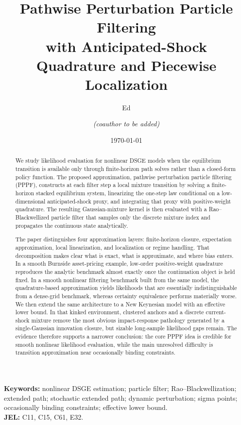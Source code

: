 \documentclass[11pt]{article}
\title{Pathwise Perturbation Particle Filtering\\
with Anticipated-Shock Quadrature and Piecewise Localization}
\author{Ed \and \emph{(coauthor to be added)}}
\date{\today}
\theoremstyle{remark}
\begin{document}
\maketitle

\begin{abstract}
We study likelihood evaluation for nonlinear DSGE models when the equilibrium transition is available only through finite-horizon path solves rather than a closed-form policy function.
The proposed approximation, pathwise perturbation particle filtering (PPPF), constructs at each filter step a local mixture transition by solving a finite-horizon stacked equilibrium system, linearizing the one-step law conditional on a low-dimensional anticipated-shock proxy, and integrating that proxy with positive-weight quadrature.
The resulting Gaussian-mixture kernel is then evaluated with a Rao--Blackwellized particle filter that samples only the discrete mixture index and propagates the continuous state analytically.

The paper distinguishes four approximation layers: finite-horizon closure, expectation approximation, local linearization, and localization or regime handling.
That decomposition makes clear what is exact, what is approximate, and where bias enters.
In a smooth Burnside asset-pricing example, low-order positive-weight quadrature reproduces the analytic benchmark almost exactly once the continuation object is held fixed.
In a smooth nonlinear filtering benchmark built from the same model, the quadrature-based approximation yields likelihoods that are essentially indistinguishable from a dense-grid benchmark, whereas certainty equivalence performs materially worse.
We then extend the same architecture to a New Keynesian model with an effective lower bound.
In that kinked environment, clustered anchors and a discrete current-shock mixture remove the most obvious impact-response pathology generated by a single-Gaussian innovation closure, but sizable long-sample likelihood gaps remain.
The evidence therefore supports a narrower conclusion: the core PPPF idea is credible for smooth nonlinear likelihood evaluation, while the main unresolved difficulty is transition approximation near occasionally binding constraints.
\end{abstract}

\noindent\textbf{Keywords:} nonlinear DSGE estimation; particle filter; Rao--Blackwellization; extended path; stochastic extended path; dynamic perturbation; sigma points; occasionally binding constraints; effective lower bound.\\
\textbf{JEL:} C11, C15, C61, E32.
\end{document}
